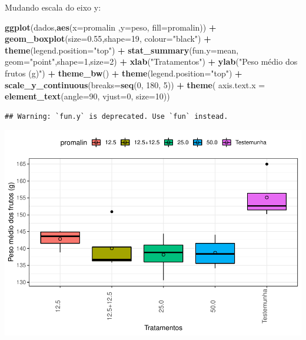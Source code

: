 \documentclass[
]{book}
\newenvironment{Shaded}{\begin{snugshade}}{\end{snugshade}}
\newcommand{\DataTypeTok}[1]{\textcolor[rgb]{0.13,0.29,0.53}{#1}}
\newcommand{\DecValTok}[1]{\textcolor[rgb]{0.00,0.00,0.81}{#1}}
\newcommand{\FloatTok}[1]{\textcolor[rgb]{0.00,0.00,0.81}{#1}}
\newcommand{\KeywordTok}[1]{\textcolor[rgb]{0.13,0.29,0.53}{\textbf{#1}}}
\newcommand{\NormalTok}[1]{#1}
\newcommand{\OperatorTok}[1]{\textcolor[rgb]{0.81,0.36,0.00}{\textbf{#1}}}
\newcommand{\StringTok}[1]{\textcolor[rgb]{0.31,0.60,0.02}{#1}}
\begin{document}
Mudando escala do eixo y:

\begin{Shaded}
\begin{Highlighting}[]
\KeywordTok{ggplot}\NormalTok{(dados,}\KeywordTok{aes}\NormalTok{(}\DataTypeTok{x=}\NormalTok{promalin ,}\DataTypeTok{y=}\NormalTok{peso, }\DataTypeTok{fill=}\NormalTok{promalin)) }\OperatorTok{+}\StringTok{ }
\StringTok{      }\KeywordTok{geom_boxplot}\NormalTok{(}\DataTypeTok{size=}\FloatTok{0.55}\NormalTok{,}\DataTypeTok{shape=}\DecValTok{19}\NormalTok{, }\DataTypeTok{colour=}\StringTok{"black"}\NormalTok{) }\OperatorTok{+}\StringTok{ }
\StringTok{      }\KeywordTok{theme}\NormalTok{(}\DataTypeTok{legend.position=}\StringTok{"top"}\NormalTok{) }\OperatorTok{+}\StringTok{ }
\StringTok{      }\KeywordTok{stat_summary}\NormalTok{(}\DataTypeTok{fun.y=}\NormalTok{mean, }\DataTypeTok{geom=}\StringTok{"point"}\NormalTok{,}\DataTypeTok{shape=}\DecValTok{1}\NormalTok{,}\DataTypeTok{size=}\DecValTok{2}\NormalTok{) }\OperatorTok{+}\StringTok{ }
\StringTok{      }\KeywordTok{xlab}\NormalTok{(}\StringTok{"Tratamentos"}\NormalTok{) }\OperatorTok{+}\StringTok{  }
\StringTok{      }\KeywordTok{ylab}\NormalTok{(}\StringTok{"Peso médio dos frutos (g)"}\NormalTok{)  }\OperatorTok{+}
\StringTok{      }\KeywordTok{theme_bw}\NormalTok{() }\OperatorTok{+}
\StringTok{      }\KeywordTok{theme}\NormalTok{(}\DataTypeTok{legend.position=}\StringTok{"top"}\NormalTok{) }\OperatorTok{+}
\StringTok{      }\KeywordTok{scale_y_continuous}\NormalTok{(}\DataTypeTok{breaks=}\KeywordTok{seq}\NormalTok{(}\DecValTok{0}\NormalTok{, }\DecValTok{180}\NormalTok{, }\DecValTok{5}\NormalTok{)) }\OperatorTok{+}
\StringTok{      }\KeywordTok{theme}\NormalTok{( }\DataTypeTok{axis.text.x  =} \KeywordTok{element_text}\NormalTok{(}\DataTypeTok{angle=}\DecValTok{90}\NormalTok{, }\DataTypeTok{vjust=}\DecValTok{0}\NormalTok{, }\DataTypeTok{size=}\DecValTok{10}\NormalTok{))}
\end{Highlighting}
\end{Shaded}

\begin{verbatim}
## Warning: `fun.y` is deprecated. Use `fun` instead.
\end{verbatim}

\includegraphics{TudodoR_files/figure-latex/unnamed-chunk-239-1.pdf}
\end{document}
